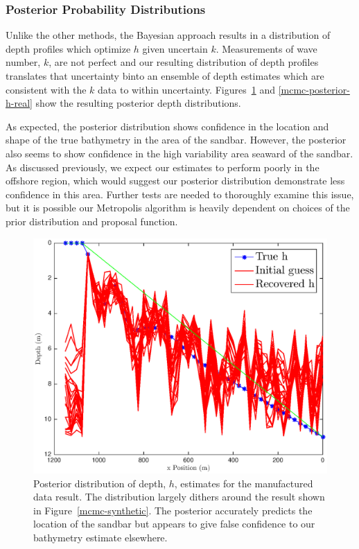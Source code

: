 \subsubsection{Posterior Probability Distributions}

Unlike the other methods, the Bayesian approach results in a distribution of depth profiles which optimize $h$ given uncertain $k$. Measurements of wave number, $k$, are not perfect and our resulting distribution of depth profiles translates that uncertainty binto an ensemble of depth estimates which are consistent with the $k$ data to within uncertainty. Figures~\ref{mcmc-posterior-h-synthetic} and \ref{mcmc-posterior-h-real} show the resulting posterior depth distributions. 

As expected, the posterior distribution shows confidence in the location and shape of the true bathymetry in the area of the sandbar. However, the posterior also seems to show confidence in the high variability area seaward of the sandbar. As discussed previously, we expect our estimates to perform poorly in the offshore region, which would suggest our posterior distribution demonstrate less confidence in this area. Further tests are needed to thoroughly examine this issue, but it is possible our Metropolis algorithm is heavily dependent on choices of the prior distribution and proposal function. 


\begin{figure}[H]
\center
\includegraphics[scale=0.46]{img/MCMC-posterior-manufactured}
\caption{Posterior distribution of depth, $h$, estimates for the manufactured data result. The distribution largely dithers around the result shown in Figure~\ref{mcmc-synthetic}. The posterior accurately predicts the location of the sandbar but appears to give false confidence to our bathymetry estimate elsewhere.}
\label{mcmc-posterior-h-synthetic}
\end{figure}





